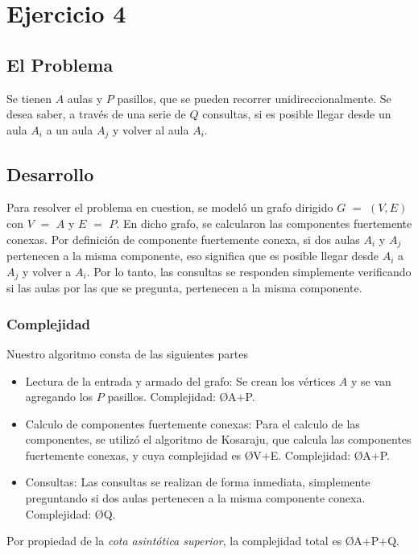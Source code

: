 \section{Ejercicio 4}
\subsection{El Problema}
Se tienen $A$ aulas y $P$ pasillos, que se pueden recorrer unidireccionalmente. Se desea saber, a través de una serie de $Q$ consultas, si es posible llegar desde un aula $A_{i}$ a un aula $A_{j}$ y volver al aula $A_{i}$.

\subsection{Desarrollo}
Para resolver el problema en cuestion, se modeló un grafo dirigido $G$ $=$ $(V,E)$ con $V$ $=$ $A$ y $E$ $=$ $P$.
En dicho grafo, se calcularon las componentes fuertemente conexas.
Por definición de componente fuertemente conexa, si dos aulas $A_{i}$ y $A_{j}$ pertenecen a la misma componente, eso significa que es posible llegar desde $A_{i}$ a $A_{j}$ y volver a $A_{i}$\textsuperscript{\cite{cfc}}.
Por lo tanto, las consultas se responden simplemente verificando si las aulas por las que se pregunta, pertenecen a la misma componente.

\subsubsection{Complejidad}
Nuestro algoritmo consta de las siguientes partes
\begin{itemize}
	\item Lectura de la entrada y armado del grafo: Se crean los vértices $A$ y se van agregando los $P$ pasillos. Complejidad: \O{A+P}.
	\item Calculo de componentes fuertemente conexas: Para el calculo de las componentes, se utilizó el algoritmo de Kosaraju, que calcula las componentes fuertemente conexas, y cuya complejidad es \O{V+E}\textsuperscript{\cite{cormen}}. Complejidad: \O{A+P}.
	\item Consultas: Las consultas se realizan de forma inmediata, simplemente preguntando si dos aulas pertenecen a la misma componente conexa. Complejidad: \O{Q}.
\end{itemize}

Por propiedad de la \emph{cota asintótica superior}, la complejidad total es \O{A+P+Q}.